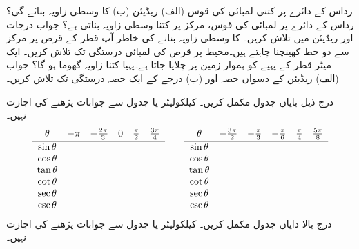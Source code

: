 رداس  کے دائرے پر کتنی لمبائی کی قوس  (الف)  ریڈیئن (ب)  کا وسطی زاویہ بنائے گی؟
رداس  کے دائرے پر  لمبائی کی قوس، مرکز پر کتنا وسطی زاویہ بناتی ہے؟ جواب درجات اور ریڈیئن میں تلاش کریں۔ 
\quad
{} کا وسطی زاویہ بنانے  کی خاطر  آپ  قطر کے قرص پر مرکز سے  دو خط کھینچنا چاہتے ہیں۔محیط پر قرص کی لمبائی  درستگی تک تلاش کریں۔
\quad
ایک میٹر قطر کے پہیے کو ہموار زمین پر چلایا جاتا ہے۔پہیا کتنا زاویہ گھوما ہو گا؟ جواب (الف)  ریڈیئن کے دسواں حصہ اور (ب)  درجے  کے ایک حصہ درستگی تک تلاش کریں۔

درج ذیل بایاں جدول مکمل کریں۔ کیلکولیٹر یا جدول سے جوابات پڑھنے کی اجازت نہیں۔
\begin{align*}
\begin{array}{cccccc}
\theta&-\pi&-\tfrac{2\pi}{3}&0&\tfrac{\pi}{2}&\tfrac{3\pi}{4}\Bstrut\\ 
\hline
\sin \theta\\
\cos \theta\\
\tan \theta\\
\cot \theta\\
\sec\theta\\
\csc\theta
\end{array}\quad\quad
\begin{array}{cccccc}
\theta&-\tfrac{3\pi}{2}&-\tfrac{\pi}{3}&-\tfrac{\pi}{6}&\tfrac{\pi}{4}&\tfrac{5\pi}{8}\Bstrut\\ 
\hline
\sin \theta\\
\cos \theta\\
\tan \theta\\
\cot \theta\\
\sec\theta\\
\csc\theta
\end{array}
\end{align*}
درج بالا دایاں جدول مکمل کریں۔ کیلکولیٹر یا جدول سے جوابات پڑھنے کی اجازت نہیں۔

